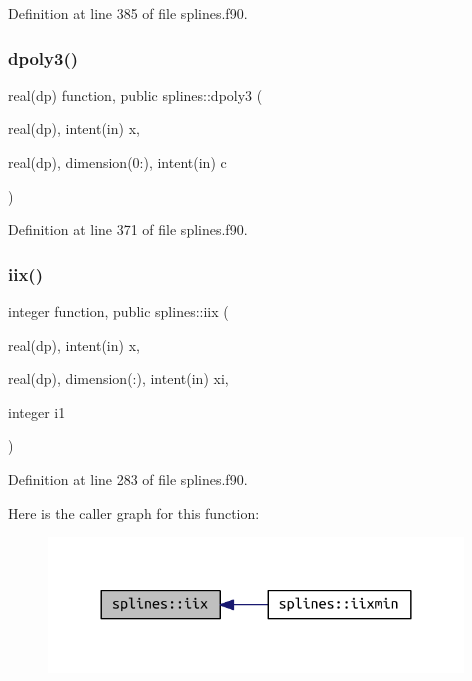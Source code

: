 Definition at line 385 of file splines.\+f90.

\mbox{\label{namespacesplines_a61a0713641022429d90d94dbc683d16c}} 
\subsubsection{\texorpdfstring{dpoly3()}{dpoly3()}}
{\footnotesize\ttfamily real(dp) function, public splines\+::dpoly3 (\begin{DoxyParamCaption}\item[{real(dp), intent(in)}]{x,  }\item[{real(dp), dimension(0\+:), intent(in)}]{c }\end{DoxyParamCaption})}



Definition at line 371 of file splines.\+f90.

\mbox{\label{namespacesplines_a0f964b42918aebb07ea640368240d3b3}} 
\subsubsection{\texorpdfstring{iix()}{iix()}}
{\footnotesize\ttfamily integer function, public splines\+::iix (\begin{DoxyParamCaption}\item[{real(dp), intent(in)}]{x,  }\item[{real(dp), dimension(\+:), intent(in)}]{xi,  }\item[{integer}]{i1 }\end{DoxyParamCaption})}



Definition at line 283 of file splines.\+f90.

Here is the caller graph for this function\+:
\nopagebreak
\begin{figure}[H]
\begin{center}
\leavevmode
\includegraphics[width=312pt]{namespacesplines_a0f964b42918aebb07ea640368240d3b3_icgraph}
\end{center}
\end{figure}
\mbox{\label{namespacesplines_a150ebea82fdfc65f1928d6c8d0a249d5}} 
